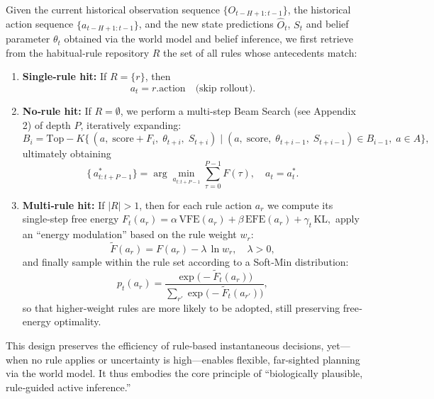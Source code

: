 Given the current historical observation sequence $\{O_{t-H+1:t-1}\}$, the historical action sequence $\{a_{t-H+1:t-1}\}$, and the new state predictions $\hat{O}_t$, $S_t$ and belief parameter $\theta_t$ obtained via the world model and belief inference, we first retrieve from the habitual‐rule repository \(R\) the set of all rules whose antecedents match:

\begin{enumerate}[label=(\arabic*)]
  \item \textbf{Single‐rule hit:} If \(R = \{r\}\), then
    \[
      a_t = r.\mathrm{action}
      \quad\text{(skip rollout).}
    \]
  \item \textbf{No‐rule hit:} If \(R = \emptyset\), we perform a multi‐step Beam Search (see Appendix 2) of depth \(P\), iteratively expanding:
    \[
      B_i = \mathrm{Top}\!-\!K\bigl\{\,(a,\;\mathrm{score}+F_i,\;\theta_{t+i},\;S_{t+i})
      \mid (a,\;\mathrm{score},\;\theta_{t+i-1},\;S_{t+i-1}) \in B_{i-1},\;a\in A \bigr\},
    \]
    ultimately obtaining
    \[
      \{\,a^*_{t:t+P-1}\}
      = \arg\min_{a_{t:t+P-1}}\sum_{\tau=0}^{P-1}F(\tau),
      \quad a_t = a^*_t.
    \]
  \item \textbf{Multi‐rule hit:} If \(\lvert R\rvert > 1\), then for each rule action \(a_r\) we compute its single‐step free energy $F_t(a_r)
      = \alpha\,\mathrm{VFE}(a_r)
      + \beta\,\mathrm{EFE}(a_r)
      + \gamma_t\,\mathrm{KL},$
    apply an ``energy modulation'' based on the rule weight \(w_r\):
    \[
      \tilde{F}(a_r)
      = F(a_r)
      - \lambda\,\ln w_r,\quad \lambda>0,
    \]
    and finally sample within the rule set according to a Soft‐Min distribution:
    \[
      p_t(a_r)
      = \frac{\exp\bigl(-\tilde{F}_t(a_r)\bigr)}
             {\sum_{r'}\exp\bigl(-\tilde{F}_t(a_{r'})\bigr)},
    \]
    so that higher‐weight rules are more likely to be adopted, still preserving free‐energy optimality.
\end{enumerate}
This design preserves the efficiency of rule‐based instantaneous decisions, yet—when no rule applies or uncertainty is high—enables flexible, far‐sighted planning via the world model.  It thus embodies the core principle of ``biologically plausible, rule‐guided active inference.'' 